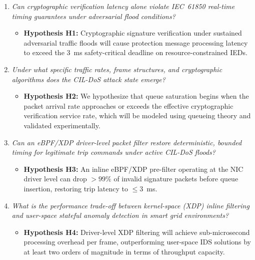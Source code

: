 \documentclass[12pt,a4paper]{article}
\begin{document}
\begin{enumerate}[leftmargin=1.5cm]
  \item[\textbf{RQ1.}] \emph{Can cryptographic verification latency alone violate IEC~61850 real-time timing guarantees under adversarial flood conditions?}
  \begin{itemize}[noitemsep, label=$\rightarrow$]
    \item \textbf{Hypothesis H1:} Cryptographic signature verification under sustained adversarial traffic floods will cause protection message processing latency to exceed the 3~ms safety-critical deadline on resource-constrained IEDs.
  \end{itemize}

  \item[\textbf{RQ2.}] \emph{Under what specific traffic rates, frame structures, and cryptographic algorithms does the CIL-DoS attack state emerge?}
  \begin{itemize}[noitemsep, label=$\rightarrow$]
    \item \textbf{Hypothesis H2:} We hypothesize that queue saturation begins when the packet arrival rate approaches or exceeds the effective cryptographic verification service rate, which will be modeled using queueing theory and validated experimentally.
  \end{itemize}

  \item[\textbf{RQ3.}] \emph{Can an eBPF/XDP driver-level packet filter restore deterministic, bounded timing for legitimate trip commands under active CIL-DoS floods?}
  \begin{itemize}[noitemsep, label=$\rightarrow$]
    \item \textbf{Hypothesis H3:} An inline eBPF/XDP pre-filter operating at the NIC driver level can drop $>99\%$ of invalid signature packets before queue insertion, restoring trip latency to $\le 3$~ms.
  \end{itemize}

  \item[\textbf{RQ4.}] \emph{What is the performance trade-off between kernel-space (XDP) inline filtering and user-space stateful anomaly detection in smart grid environments?}
  \begin{itemize}[noitemsep, label=$\rightarrow$]
    \item \textbf{Hypothesis H4:} Driver-level XDP filtering will achieve sub-microsecond processing overhead per frame, outperforming user-space IDS solutions by at least two orders of magnitude in terms of throughput capacity.
  \end{itemize}
\end{enumerate}
\end{document}
